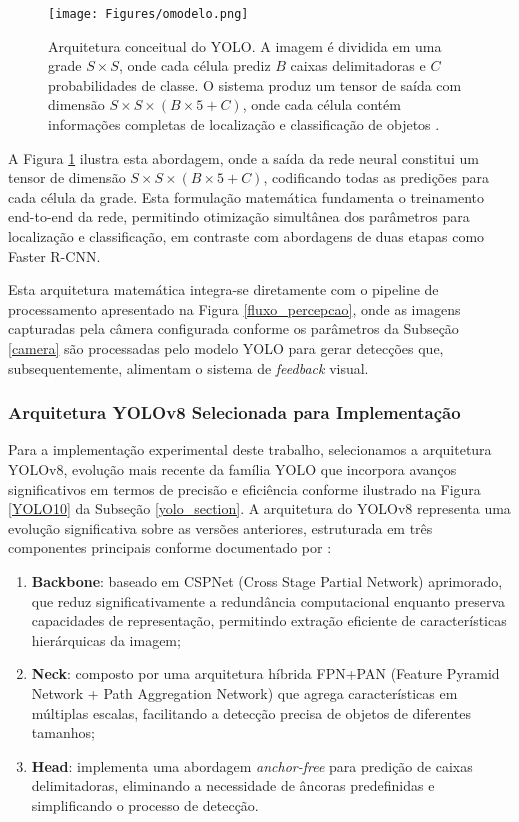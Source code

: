 \begin{figure}[H]
\centering
\texttt{[image: Figures/omodelo.png]}
\caption{Arquitetura conceitual do YOLO. A imagem é dividida em uma grade $S \times S$, onde cada célula prediz $B$ caixas delimitadoras e $C$ probabilidades de classe. O sistema produz um tensor de saída com dimensão $S \times S \times (B \times 5 + C)$, onde cada célula contém informações completas de localização e classificação de objetos \cite[p.~2]{redmon2016lookonceunifiedrealtime}.}
\label{omodelo}
\end{figure}

A Figura \ref{omodelo} ilustra esta abordagem, onde a saída da rede neural constitui um tensor de dimensão $S \times S \times (B \times 5 + C)$, codificando todas as predições para cada célula da grade. Esta formulação matemática fundamenta o treinamento end-to-end da rede, permitindo otimização simultânea dos parâmetros para localização e classificação, em contraste com abordagens de duas etapas como Faster R-CNN.

Esta arquitetura matemática integra-se diretamente com o pipeline de processamento apresentado na Figura \ref{fluxo_percepcao}, onde as imagens capturadas pela câmera configurada conforme os parâmetros da Subseção \ref{camera} são processadas pelo modelo YOLO para gerar detecções que, subsequentemente, alimentam o sistema de \textit{feedback} visual.

\subsubsection{Arquitetura YOLOv8 Selecionada para Implementação}

Para a implementação experimental deste trabalho, selecionamos a arquitetura YOLOv8, evolução mais recente da família YOLO que incorpora avanços significativos em termos de precisão e eficiência conforme ilustrado na Figura \ref{YOLO10} da Subseção \ref{yolo_section}. A arquitetura do YOLOv8 representa uma evolução significativa sobre as versões anteriores, estruturada em três componentes principais conforme documentado por :

\begin{enumerate}
    \item \textbf{Backbone}: baseado em CSPNet (Cross Stage Partial Network) aprimorado, que reduz significativamente a redundância computacional enquanto preserva capacidades de representação, permitindo extração eficiente de características hierárquicas da imagem;
    
    \item \textbf{Neck}: composto por uma arquitetura híbrida FPN+PAN (Feature Pyramid Network + Path Aggregation Network) que agrega características em múltiplas escalas, facilitando a detecção precisa de objetos de diferentes tamanhos;
    
    \item \textbf{Head}: implementa uma abordagem \textit{anchor-free} para predição de caixas delimitadoras, eliminando a necessidade de âncoras predefinidas e simplificando o processo de detecção.
\end{enumerate}

